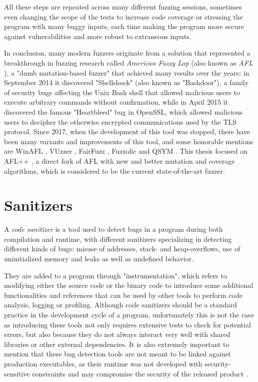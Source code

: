 All these steps are repeated across many different fuzzing sessions, sometimes even changing the scope of the tests to increase code coverage or stressing the program with many buggy inputs, each time making the program more secure against vulnerabilities and more robust to extraneous inputs. 

In conclusion, many modern fuzzers originate from a solution that represented a breakthrough in fuzzing research called \textit{American Fuzzy Lop} (also known as \textit{AFL} \cite{afl}), a "dumb mutation-based fuzzer" that achieved many results over the years: in September 2014 it discovered "Shellshock" \cite{shellshock} (also known as "Bashdoor"), a family of security bugs affecting the Unix Bash shell that allowed malicious users to execute arbitrary commands without confirmation, while in April 2015 it discovered the famous "Heartbleed" \cite{heartbleed} bug in OpenSSL, which allowed malicious users to decipher the otherwise encrypted communications used by the TLS protocol.
Since 2017, when the development of this tool was stopped, there have been many variants and improvements of this tool, and some honorable mentions are WinAFL \cite{winafl}, VUzzer \cite{vuzzer}, FairFuzz \cite{fairfuzz}, Fuzzolic \cite{fuzzolic} and QSYM \cite{qsym}. This thesis focused on AFL++ \cite{AFL++}, a direct fork of AFL with new and better mutation and coverage algorithms, which is considered to be the current state-of-the-art fuzzer.







\newpage
\section{Sanitizers} \label{sanitizers}
A \textit{code sanitizer} is a tool used to detect bugs in a program during both compilation and runtime, with different sanitizers specializing in detecting different kinds of bugs: misuse of addresses, stack- and heap-overflows, use of uninitialized memory and leaks as well as undefined behavior.

They are added to a program through "instrumentation", which refers to modifying either the source code or the binary code to introduce some additional functionalities and references that can be used by other tools to perform code analysis, logging or profiling. Although code sanitizers should be a standard practice in the development cycle of a program, unfortunately this is not the case as introducing these tools not only requires extensive tests to check for potential errors, but also because they do not always interact very well with shared libraries or other external dependencies. It is also extremely important to mention that these bug detection tools are not meant to be linked against production executables, as their runtime was not developed with security-sensitive constraints and may compromise the security of the released product \cite{asan_docs}\cite{msan_docs}\cite{ubsan_docs}.

